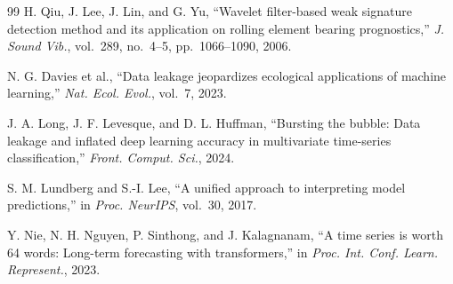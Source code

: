 \documentclass[pdflatex,sn-mathphys-num]{sn-jnl}
\begin{document}
\begin{thebibliography}{99}
H. Qiu, J. Lee, J. Lin, and G. Yu,
``Wavelet filter-based weak signature detection method and its application on rolling element bearing prognostics,''
\textit{J. Sound Vib.}, vol.~289, no.~4--5, pp.~1066--1090, 2006.

N. G. Davies et al.,
``Data leakage jeopardizes ecological applications of machine learning,''
\textit{Nat. Ecol. Evol.}, vol.~7, 2023.

J. A. Long, J. F. Levesque, and D. L. Huffman,
``Bursting the bubble: Data leakage and inflated deep learning accuracy in multivariate time-series classification,''
\textit{Front. Comput. Sci.}, 2024.

S. M. Lundberg and S.-I. Lee,
``A unified approach to interpreting model predictions,''
in \textit{Proc. NeurIPS}, vol.~30, 2017.

Y. Nie, N. H. Nguyen, P. Sinthong, and J. Kalagnanam,
``A time series is worth 64 words: Long-term forecasting with transformers,''
in \textit{Proc. Int. Conf. Learn. Represent.}, 2023.

\end{thebibliography}
\end{document}
